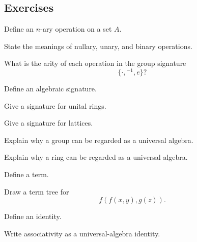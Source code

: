 \subsection{Exercises}
\label{subsec:universal-algebra-exercises}

\begin{exercise}[1]
Define an \(n\)-ary operation on a set \(A\).
\end{exercise}

\begin{exercise}[1]
State the meanings of nullary, unary, and binary operations.
\end{exercise}

\begin{exercise}[1]
What is the arity of each operation in the group signature
\[ \{\cdot,{}^{-1},e\}? \]
\end{exercise}

\begin{exercise}[1]
Define an algebraic signature.
\end{exercise}

\begin{exercise}[1]
Give a signature for unital rings.
\end{exercise}

\begin{exercise}[1]
Give a signature for lattices.
\end{exercise}

\begin{exercise}[2]
Explain why a group can be regarded as a universal algebra.
\end{exercise}

\begin{exercise}[2]
Explain why a ring can be regarded as a universal algebra.
\end{exercise}

\begin{exercise}[1]
Define a term.
\end{exercise}

\begin{exercise}[2]
Draw a term tree for
\[ f(f(x,y),g(z)). \]
\end{exercise}

\begin{exercise}[1]
Define an identity.
\end{exercise}

\begin{exercise}[1]
Write associativity as a universal-algebra identity.
\end{exercise}

